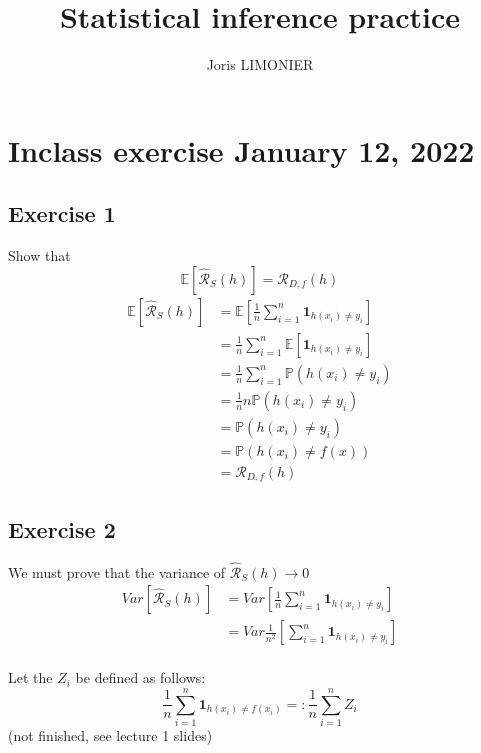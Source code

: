 \documentclass{article}
\title{Statistical inference practice}
\author{Joris LIMONIER}
\newcommand{\1}{\mathbf{1}}
\newcommand{\E}{\mathbb{E}}
\renewcommand{\P}{\mathbb{P}}
\begin{document}
\maketitle

\tableofcontents

\section{Inclass exercise January 12, 2022}
\subsection{Exercise 1}
Show that
\begin{equation}
  \E \left[ \hat{\mathcal{R}}_S (h) \right] = \mathcal{R}_{D, f} (h)
\end{equation}
\begin{align*}
  \E \left[ \hat{\mathcal{R}}_S (h) \right]
   & = \E \left[ \frac{1}{n} \sum_{i=1}^n \mathbf{1}_{h(x_i) \neq y_i} \right] \\
   & = \frac{1}{n} \sum_{i=1}^n \E \left[ \mathbf{1}_{h(x_i) \neq y_i} \right] \\
   & = \frac{1}{n} \sum_{i=1}^n \P \left(h(x_i) \neq y_i \right)               \\
   & = \frac{1}{n} n  \P \left(h(x_i) \neq y_i \right)                         \\
   & = \P \left(h(x_i) \neq y_i \right)                                        \\
   & = \P \left(h(x_i) \neq f(x) \right)                                       \\
   & = \mathcal{R}_{D, f} (h)
\end{align*}

\subsection{Exercise 2}
We must prove that the variance of \(\hat{\mathcal{R}}_S (h) \to 0\)
\begin{align*}
  Var \left[ \hat{\mathcal{R}}_S (h) \right]
   & = Var \left[ \frac{1}{n} \sum_{i=1}^n \mathbf{1}_{h(x_i) \neq y_i} \right]   \\
   & = Var \frac{1}{n^2} \left[ \sum_{i=1}^n \mathbf{1}_{h(x_i) \neq y_i} \right] \\
\end{align*}

Let the \(Z_i\) be defined as follows:
\[\frac{1}{n} \sum_{i=1}^{n} \mathbf{1}_{h(x_i) \neq f(x_i)} =: \frac{1}{n} \sum_{i=1}^{n} Z_i\]
(not finished, see lecture 1 slides)
\end{document}

